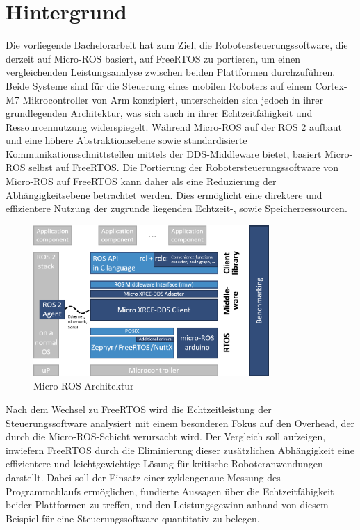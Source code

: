 \section{Hintergrund}

Die vorliegende Bachelorarbeit hat zum Ziel, die Robotersteuerungssoftware, die
derzeit auf Micro-ROS basiert, auf FreeRTOS zu portieren, um einen
vergleichenden Leistungsanalyse zwischen beiden Plattformen durchzuführen. Beide
Systeme sind für die Steuerung eines mobilen Roboters auf einem Cortex-M7
Mikrocontroller von Arm konzipiert, unterscheiden sich jedoch in ihrer
grundlegenden Architektur, was sich auch in ihrer Echtzeitfähigkeit und
Ressourcennutzung widerspiegelt. Während Micro-ROS auf der \ac{ROS 2} aufbaut und
eine höhere Abstraktionsebene sowie standardisierte Kommunikationsschnittstellen
mittels der \ac{DDS}-Middleware bietet, basiert Micro-ROS selbst auf FreeRTOS.
Die Portierung der Robotersteuerungssoftware von Micro-ROS auf FreeRTOS kann
daher als eine Reduzierung der Abhängigkeitsebene betrachtet werden. Dies
ermöglicht eine direktere und effizientere Nutzung der zugrunde liegenden
Echtzeit-, sowie Speicherressourcen.

\begin{figure}[htb]
    \centering
    \includegraphics[width=0.8\textwidth]{assets/Micro-ROS_architecture}
    \caption{Micro-ROS Architektur\cite[S. 6]{koubaa2023}}
\end{figure}

Nach dem Wechsel zu FreeRTOS wird die Echtzeitleistung der Steuerungssoftware
analysiert mit einem besonderen Fokus auf den Overhead, der durch die
Micro-ROS-Schicht verursacht wird. Der Vergleich soll aufzeigen, inwiefern
FreeRTOS durch die Eliminierung dieser zusätzlichen Abhängigkeit eine
effizientere und leichtgewichtige Lösung für kritische Roboteranwendungen
darstellt. Dabei soll der Einsatz einer zyklengenaue Messung des Programmablaufs
ermöglichen, fundierte Aussagen über die Echtzeitfähigkeit beider Plattformen zu
treffen, und den Leistungsgewinn anhand von diesem Beispiel für eine
Steuerungssoftware quantitativ zu belegen.

